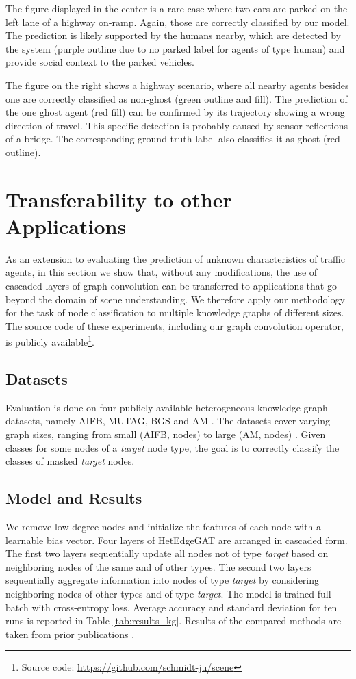 \documentclass[letterpaper, 10 pt, journal, twoside]{IEEEtran}
\begin{document}
The figure displayed in the center is a rare case where two cars are parked on the left lane of a highway on-ramp.
Again, those are correctly classified by our model.
The prediction is likely supported by the humans nearby, which are detected by the system (purple outline due to no parked label for agents of type human) and provide social context to the parked vehicles.

The figure on the right shows a highway scenario, where all nearby agents besides one are correctly classified as non-ghost (green outline and fill).
The prediction of the one ghost agent (red fill) can be confirmed by its trajectory showing a wrong direction of travel.
This specific detection is probably caused by sensor reflections of a bridge. The corresponding ground-truth label also classifies it as ghost (red outline).

\section{Transferability to other Applications}
As an extension to evaluating the prediction of unknown characteristics of traffic agents, in this section we show that, without any modifications, the use of cascaded layers of graph convolution can be transferred to applications that go beyond the domain of scene understanding.
We therefore apply our methodology for the task of node classification to multiple knowledge graphs of different sizes.
The source code of these experiments, including our graph convolution operator, is publicly available\footnote[3]{Source code: \url{https://github.com/schmidt-ju/scene}}.

\subsection{Datasets}
Evaluation is done on four publicly available heterogeneous knowledge graph datasets, namely AIFB, MUTAG, BGS and AM \cite{Ristoski2016}.
The datasets cover varying graph sizes, ranging from small (AIFB,  nodes) to large (AM,  nodes) \cite{Schlichtkrull2018}.
Given classes for some nodes of a \textit{target} node type, the goal is to correctly classify the classes of masked \textit{target} nodes.

\subsection{Model and Results}
We remove low-degree nodes and initialize the features of each node with a learnable bias vector.
Four layers of HetEdgeGAT are arranged in cascaded form.
The first two layers sequentially update all nodes not of type \textit{target} based on neighboring nodes of the same and of other types.
The second two layers sequentially aggregate information into nodes of type \textit{target} by considering neighboring nodes of other types and of type \textit{target}.
The model is trained full-batch with cross-entropy loss.
Average accuracy and standard deviation for ten runs is reported in Table \ref{tab:results_kg}.
Results of the compared methods are taken from prior publications \cite{Schlichtkrull2018,  Vandewiele2019, Shervashidze2011, Ristoski2019}.
\end{document}
